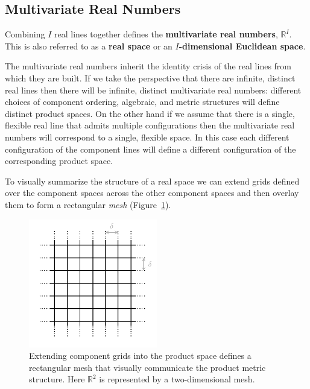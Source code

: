 \documentclass[
  letterpaper,
  DIV=11,
  numbers=noendperiod]{scrartcl}
\begin{document}
\hypertarget{multivariate-real-numbers}{%
\subsection{Multivariate Real Numbers}\label{multivariate-real-numbers}}

Combining \(I\) real lines together defines the \textbf{multivariate
real numbers}, \(\mathbb{R}^{I}\). This is also referred to as a
\textbf{real space} or an \textbf{\(I\)-dimensional Euclidean space}.

The multivariate real numbers inherit the identity crisis of the real
lines from which they are built. If we take the perspective that there
are infinite, distinct real lines then there will be infinite, distinct
multivariate real numbers: different choices of component ordering,
algebraic, and metric structures will define distinct product spaces. On
the other hand if we assume that there is a single, flexible real line
that admits multiple configurations then the multivariate real numbers
will correspond to a single, flexible space. In this case each different
configuration of the component lines will define a different
configuration of the corresponding product space.

To visually summarize the structure of a real space we can extend grids
defined over the component spaces across the other component spaces and
then overlay them to form a rectangular \emph{mesh}
(Figure~\ref{fig-real_space_grid}).

\begin{figure}

{\centering \includegraphics[width=0.5\textwidth,height=\textheight]{figures/real_space_grid/real_space_grid.pdf}

}

\caption{\label{fig-real_space_grid}Extending component grids into the
product space defines a rectangular mesh that visually communicate the
product metric structure. Here \(\mathbb{R}^{2}\) is represented by a
two-dimensional mesh.}

\end{figure}
\end{document}
